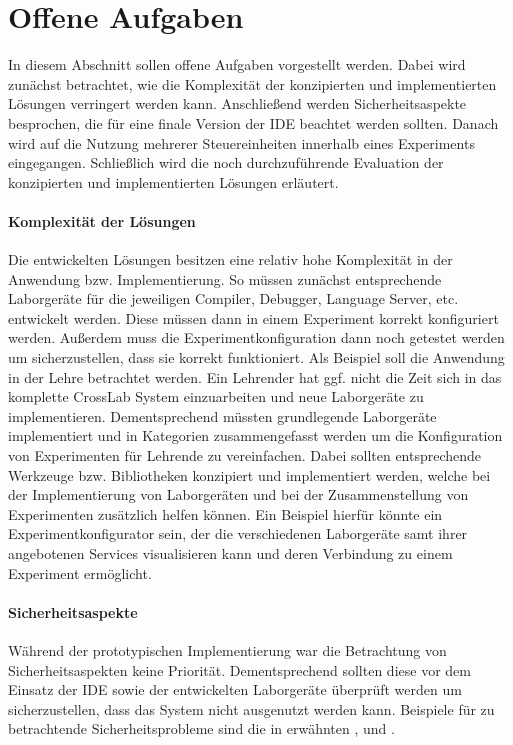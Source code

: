 \section{Offene Aufgaben}\label{section:diskussion:offene-aufgaben}

In diesem Abschnitt sollen offene Aufgaben vorgestellt werden. Dabei wird zunächst betrachtet, wie die Komplexität der konzipierten und implementierten Lösungen verringert werden kann. Anschließend werden Sicherheitsaspekte besprochen, die für eine finale Version der IDE beachtet werden sollten. Danach wird auf die Nutzung mehrerer Steuereinheiten innerhalb eines Experiments eingegangen. Schließlich wird die noch durchzuführende Evaluation der konzipierten und implementierten Lösungen erläutert.

\paragraph{Komplexität der Lösungen}
Die entwickelten Lösungen besitzen eine relativ hohe Komplexität in der Anwendung bzw. Implementierung. So müssen zunächst entsprechende Laborgeräte für die jeweiligen Compiler, Debugger, Language Server, etc. entwickelt werden. Diese müssen dann in einem Experiment korrekt konfiguriert werden. Außerdem muss die Experimentkonfiguration dann noch getestet werden um sicherzustellen, dass sie korrekt funktioniert. Als Beispiel soll die Anwendung in der Lehre betrachtet werden. Ein Lehrender hat ggf. nicht die Zeit sich in das komplette CrossLab System einzuarbeiten und neue Laborgeräte zu implementieren. Dementsprechend müssten grundlegende Laborgeräte implementiert und in Kategorien zusammengefasst werden um die Konfiguration von Experimenten für Lehrende zu vereinfachen. Dabei sollten entsprechende Werkzeuge bzw. Bibliotheken konzipiert und implementiert werden, welche bei der Implementierung von Laborgeräten und bei der Zusammenstellung von Experimenten zusätzlich helfen können. Ein Beispiel hierfür könnte ein Experimentkonfigurator sein, der die verschiedenen Laborgeräte samt ihrer angebotenen Services visualisieren kann und deren Verbindung zu einem Experiment ermöglicht.

\paragraph{Sicherheitsaspekte}
Während der prototypischen Implementierung war die Betrachtung von Sicherheitsaspekten keine Priorität. Dementsprechend sollten diese vor dem Einsatz der IDE sowie der entwickelten Laborgeräte überprüft werden um sicherzustellen, dass das System nicht ausgenutzt werden kann. Beispiele für zu betrachtende Sicherheitsprobleme sind die in \cite{wu_ceclipse_2011} erwähnten ,  und .

